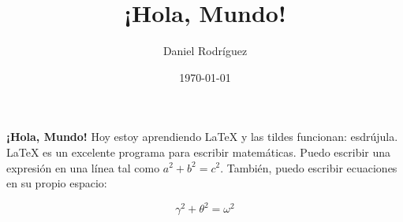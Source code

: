 \documentclass{article}
\title{¡Hola, Mundo!}
\author{Daniel Rodríguez}
\date{\today}
\begin{document}
\maketitle

\textbf{¡Hola, Mundo!} Hoy estoy aprendiendo \LaTeX{} y
las tildes funcionan: esdrújula. \LaTeX{} es un excelente
programa para escribir matemáticas. Puedo escribir una
expresión en una línea tal como $a^2 + b^2 = c^2$. También,
puedo escribir ecuaciones en su propio espacio:

\begin{equation}
    \gamma^2 + \theta^2 = \omega^2
\end{equation}
\end{document}
